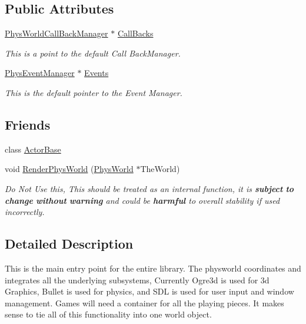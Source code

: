 \subsection*{Public Attributes}
\begin{DoxyCompactItemize}
\item 
\hyperlink{classPhysWorldCallBackManager}{PhysWorldCallBackManager} $\ast$ \hyperlink{classPhysWorld_a080ea6f1584374b07d3c1f29c7ed64df}{CallBacks}
\begin{DoxyCompactList}\small\item\em This is a point to the default Call BackManager. \item\end{DoxyCompactList}\item 
\hyperlink{classPhysEventManager}{PhysEventManager} $\ast$ \hyperlink{classPhysWorld_a601b3c6093aaf2a69fcd3311dde9aadc}{Events}
\begin{DoxyCompactList}\small\item\em This is the default pointer to the Event Manager. \item\end{DoxyCompactList}\end{DoxyCompactItemize}
\subsection*{Friends}
\begin{DoxyCompactItemize}
\item 
\hypertarget{classPhysWorld_ac09063d4b0192680ba3aa0bd4003a274}{
class \hyperlink{classPhysWorld_ac09063d4b0192680ba3aa0bd4003a274}{ActorBase}}
\label{db/df5/classPhysWorld_ac09063d4b0192680ba3aa0bd4003a274}

\item 
void \hyperlink{classPhysWorld_a54ca2a75bbccb9b2129f434874f1e693}{RenderPhysWorld} (\hyperlink{classPhysWorld}{PhysWorld} $\ast$TheWorld)
\begin{DoxyCompactList}\small\item\em Do Not Use this, This should be treated as an internal function, it is {\bfseries subject} {\bfseries to} {\bfseries change} {\bfseries without} {\bfseries warning} and could be {\bfseries harmful} to overall stability if used incorrectly. \item\end{DoxyCompactList}\end{DoxyCompactItemize}


\subsection{Detailed Description}
This is the main entry point for the entire library. The physworld coordinates and integrates all the underlying subsystems, Currently Ogre3d is used for 3d Graphics, Bullet is used for physics, and SDL is used for user input and window management. Games will need a container for all the playing pieces. It makes sense to tie all of this functionality into one world object. 

